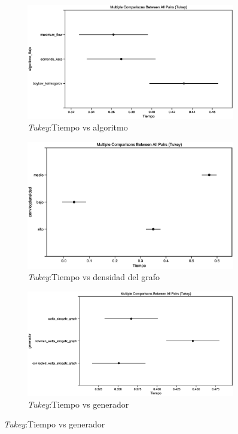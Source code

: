 \documentclass{article}
\begin{document}
\begin{figure}[htbp]

\begin{subfigure}{0.5\textwidth}
\includegraphics[width=0.9\linewidth]{Imagenes/tablatukeyalgoritmoflujo.eps} 
\caption{\textit{Tukey}:Tiempo vs algoritmo}
\end{subfigure}

\begin{subfigure}{0.5\textwidth}
\includegraphics[width=0.9\linewidth]{Imagenes/tablatukeyconvlogdensidad.eps}
\caption{\textit{Tukey}:Tiempo vs densidad del grafo}
\end{subfigure}

\begin{subfigure}{0.5\textwidth}
\includegraphics[width=0.9\linewidth]{Imagenes/tablatukeygenerador.eps}
\caption{\textit{Tukey}:Tiempo vs generador}
\end{subfigure}


\end{figure}
\end{document}
